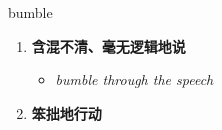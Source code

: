 
\begin{frame}
{\huge bumble}
\begin{center}
\begin{enumerate}\Large
  \item \textbf{含混不清、毫无逻辑地说}
  \begin{itemize}
    \item \em{\Large{bumble through the speech}}
  \end{itemize}
  \item \textbf{笨拙地行动}
\end{enumerate}
\end{center}
\end{frame}
